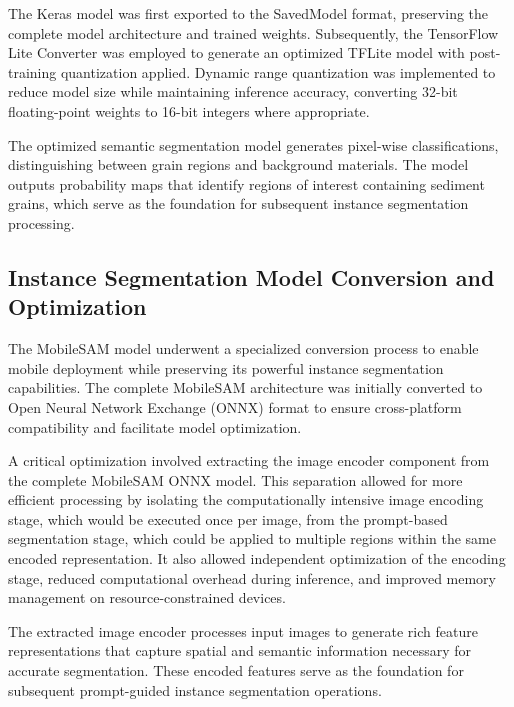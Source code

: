 \documentclass[final-report]{report-template}
\begin{document}
The Keras model was first exported to the SavedModel format, preserving the complete model architecture and trained weights. Subsequently, the TensorFlow Lite Converter was employed to generate an optimized TFLite model with post-training quantization applied. Dynamic range quantization was implemented to reduce model size while maintaining inference accuracy, converting 32-bit floating-point weights to 16-bit integers where appropriate.

The optimized semantic segmentation model generates pixel-wise classifications, distinguishing between grain regions and background materials. The model outputs probability maps that identify regions of interest containing sediment grains, which serve as the foundation for subsequent instance segmentation processing.


\subsection{Instance Segmentation Model Conversion and Optimization}
The MobileSAM model underwent a specialized conversion process to enable mobile deployment while preserving its powerful instance segmentation capabilities. The complete MobileSAM architecture was initially converted to Open Neural Network Exchange (ONNX) format to ensure cross-platform compatibility and facilitate model optimization.

A critical optimization involved extracting the image encoder component from the complete MobileSAM ONNX model. This separation allowed for more efficient processing by isolating the computationally intensive image encoding stage, which would be executed once per image, from the prompt-based segmentation stage, which could be applied to multiple regions within the same encoded representation. It also allowed independent optimization of the encoding stage, reduced computational overhead during inference, and improved memory management on resource-constrained devices.

The extracted image encoder processes input images to generate rich feature representations that capture spatial and semantic information necessary for accurate segmentation. These encoded features serve as the foundation for subsequent prompt-guided instance segmentation operations.
\end{document}
